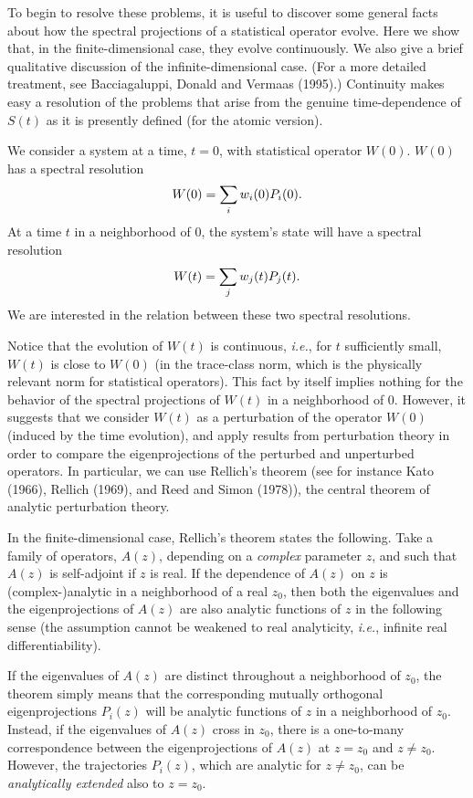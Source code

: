 \documentclass[12pt]{article}
\newcommand{\be}{\vspace*{6pt} \begin{equation}}
\newcommand{\ee}{\vspace*{10pt} \end{equation}}
\newcommand{\ie}{{\it i.e.}}         %
\begin{document}
To begin to resolve these problems, it is useful to discover some
general facts about how the spectral projections of a statistical
operator evolve.  Here we show that, in the finite-dimensional case,
they evolve continuously.  We also give a brief qualitative discussion
of the infinite-dimensional case.  (For a more detailed treatment, see
Bacciagaluppi, Donald and Vermaas (1995).) Continuity makes easy a
resolution of the problems that arise from the genuine time-dependence
of $S(t)$ as it is presently defined (for the atomic version).

We consider a system at a time, $t=0$, with statistical operator
$W(0)$.  $W(0)$ has a spectral resolution
\be
\label{eq:spectral1}
W(0)=\sum_iw_i(0)P_i(0).
\ee
At a time $t$ in a neighborhood of $0$, the system's state will have a
spectral resolution
\be
\label{eq:spectral2}
W(t)=\sum_jw_j(t)P_j(t).
\ee
\noindent We are interested in the relation between these two spectral
resolutions.

Notice that the evolution of $W(t)$ is continuous, \ie, for $t$ 
sufficiently small, $W(t)$ is close to $W(0)$ (in the trace-class 
norm, which is the physically relevant norm for statistical 
operators).  This fact by itself implies nothing for the behavior of 
the spectral projections of $W(t)$ in a neighborhood of $0$.  However, 
it suggests that we consider $W(t)$ as a perturbation of the operator 
$W(0)$ (induced by the time evolution), and apply results from 
perturbation theory in order to compare the eigenprojections of the 
perturbed and unperturbed operators.  In particular, we can use 
Rellich's theorem (see for instance Kato (1966), Rellich (1969), and 
Reed and Simon (1978)), the central theorem of analytic perturbation 
theory.

In the finite-dimensional case, Rellich's theorem states the 
following.  Take a family of operators, $A(z)$, depending on a {\em 
complex} parameter $z$, and such that $A(z)$ is self-adjoint if $z$ is 
real.  If the dependence of $A(z)$ on $z$ is (complex-)analytic in a 
neighborhood of a real $z_0$, then both the eigenvalues and the 
eigenprojections of $A(z)$ are also analytic functions of $z$ in the 
following sense (the assumption cannot be weakened to real 
analyticity, \ie, infinite real differentiability).

If the eigenvalues of $A(z)$ are distinct throughout a neighborhood of
$z_0$, the theorem simply means that the corresponding mutually
orthogonal eigenprojections $P_i(z)$ will be analytic functions of $z$
in a neighborhood of $z_0$.  Instead, if the eigenvalues of $A(z)$
cross in $z_0$, there is a one-to-many correspondence between the
eigenprojections of $A(z)$ at $z = z_0$ and $z\neq z_0$.  However, the
trajectories $P_i(z)$, which are analytic for $z\neq z_0$, can be {\em
analytically extended} also to $z = z_0$.
\end{document}
